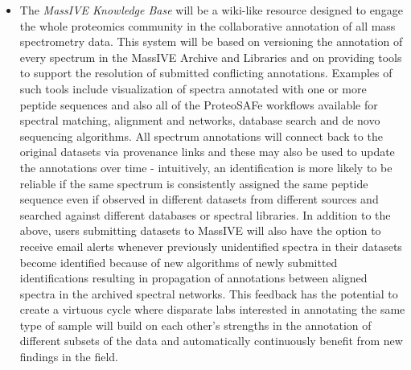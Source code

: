 \documentclass[arial,11pt]{article}
\begin{document}
\begin{itemize}
\item The {\em MassIVE Knowledge Base} will be a wiki-like resource designed to engage the whole proteomics community in the collaborative annotation of all mass spectrometry data. This system will be based on versioning the annotation of every spectrum in the MassIVE Archive and Libraries and on providing tools to support the resolution of submitted conflicting annotations. Examples of such tools include visualization of spectra annotated with one or more peptide sequences and also all of the ProteoSAFe workflows available for spectral matching, alignment and networks, database search and de novo sequencing algorithms. All spectrum annotations will connect back to the original datasets via provenance links and these may also be used to update the annotations over time \-- intuitively, an identification is more likely to be reliable if the same spectrum is consistently assigned the same peptide sequence even if observed in different datasets from different sources and searched against different databases or spectral libraries. In addition to the above, users submitting datasets to MassIVE will also have the option to receive email alerts whenever previously unidentified spectra in their datasets become identified because of new algorithms of newly submitted identifications resulting in propagation of annotations between aligned spectra in the archived spectral networks. This feedback has the potential to create a virtuous cycle where disparate labs interested in annotating the same type of sample will build on each other's strengths in the annotation of different subsets of the data and automatically continuously benefit from new findings in the field.
\end{itemize}

\end{document}

